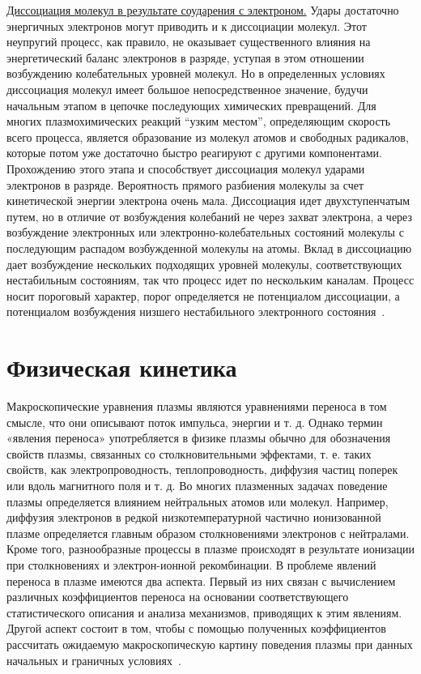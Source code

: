 \documentclass[10pt, a4paper]{article}
\let\stdsection\section
\renewcommand\section{\newpage\stdsection}
\begin{document}
\uline{Диссоциация молекул в результате соударения с электроном.} Удары достаточно энергичных электронов могут приводить и к диссоциации молекул. Этот неупругий процесс, как правило, не оказывает существенного влияния на энергетический баланс электронов в разряде, уступая в этом отношении возбуждению колебательных уровней молекул. Но в определенных условиях диссоциация молекул имеет большое непосредственное значение, будучи начальным этапом в цепочке последующих химических превращений. Для многих плазмохимических реакций ``узким местом'', определяющим скорость всего процесса, является образование из молекул атомов и свободных радикалов, которые потом уже достаточно быстро реагируют с другими компонентами. Прохождению этого этапа и способствует диссоциация молекул ударами электронов в разряде. Вероятность прямого разбиения молекулы за счет кинетической энергии электрона очень мала. Диссоциация идет двухступенчатым путем, но в отличие от возбуждения колебаний не через захват электрона, а через возбуждение электронных или электронно-колебательных состояний молекулы с последующим распадом возбужденной молекулы на атомы. Вклад в диссоциацию дает возбуждение нескольких подходящих уровней молекулы, соответствующих нестабильным состояниям, так что процесс идет по нескольким каналам. Процесс носит пороговый характер, порог определяется не потенциалом диссоциации, а потенциалом возбуждения низшего нестабильного электронного состояния~\cite{raizer}.

\section{Физическая кинетика}
\label{sec.3}

Макроскопические уравнения плазмы являются уравнениями переноса в том смысле, что они описывают поток импульса, энергии и т. д. Однако термин «явления переноса» употребляется в физике плазмы обычно для обозначения свойств плазмы, связанных со столкновительными эффектами, т. е. таких свойств, как электропроводность, теплопроводность, диффузия частиц поперек или вдоль магнитного поля и т. д. Во многих плазменных задачах поведение плазмы определяется влиянием нейтральных атомов или молекул. Например, диффузия электронов в редкой низкотемпературной частично ионизованной плазме определяется главным образом столкновениями электронов с нейтралами. Кроме того, разнообразные процессы в плазме происходят в результате ионизации при столкновениях и электрон-ионной рекомбинации. В проблеме явлений переноса в плазме имеются два аспекта. Первый из них связан с вычислением различных коэффициентов переноса на основании соответствующего статистического описания и анализа механизмов, приводящих к этим явлениям. Другой аспект состоит в том, чтобы с помощью полученных коэффициентов рассчитать ожидаемую макроскопическую картину поведения плазмы при данных начальных и граничных условиях~\cite{kroll}.
\end{document}
